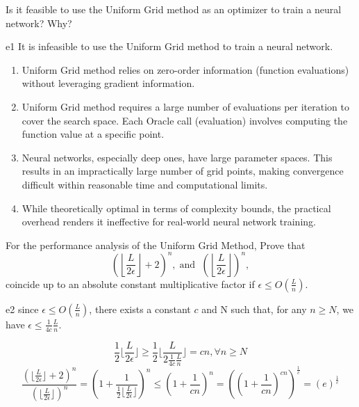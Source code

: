 \documentclass{article}
\begin{document}
\newpage
\begin{excercise}\label{e1}
Is it feasible to use the Uniform Grid method as an optimizer to train a neural network?  Why?
\end{excercise}
\begin{SOLUTION}{e1}
It is infeasible to use the Uniform Grid method to train a neural network.
\begin{enumerate}
	\item Uniform Grid method relies on zero-order information (function evaluations) without leveraging gradient information.
	\item Uniform Grid method requires a large number of evaluations per iteration to cover the search space. Each Oracle call (evaluation) involves computing the function value at a specific point. 
	\item Neural networks, especially deep ones, have large parameter spaces.  This results in an impractically large number of grid points, making convergence difficult within reasonable time and computational limits. 
	\item While theoretically optimal in terms of complexity bounds, the practical overhead renders it ineffective for real-world neural network training.
\end{enumerate}
\end{SOLUTION}
\newpage
\begin{excercise}\label{e2}
	For the performance analysis of the Uniform Grid Method, Prove that
	\begin{equation}
		\left( \left \lfloor \frac{L}{2\epsilon} \right \rfloor + 2 \right)^n,\; \textrm{and } \; \left( \left \lfloor \frac{L}{2\epsilon} \right \rfloor \right)^n,\nonumber
	\end{equation}
	coincide up to an absolute constant multiplicative factor if $\epsilon \leq O(\frac{L}{n})$.
\end{excercise}

\begin{PROOF}{e2}
since $\epsilon \leq O(\frac{L}{n})$, there exists a constant $c$ and N such that, for any $n \geq N$, we have $\epsilon \leq \frac{1}{4c} \frac{L}{n}$.

\[
	\frac{1}{2} \lfloor \frac{L}{2\epsilon} \rfloor \geq \frac{1}{2} \lfloor \frac{L}{2\frac{1}{4c} \frac{L}{n}} \rfloor = cn, \forall n \geq N
\]
\[
\frac{(\lfloor \frac{L}{2\epsilon} \rfloor + 2)^n}{(\lfloor \frac{L}{2\epsilon} \rfloor)^n} = (1 + \frac{1}{\frac{1}{2} \lfloor \frac{L}{2\epsilon} \rfloor})^n \leq (1 + \frac{1}{cn}) ^ n = ((1 + \frac{1}{cn})^{cn})^{\frac{1}{c}} = (e)^{\frac{1}{c}}
\]
\end{PROOF}
\end{document}
